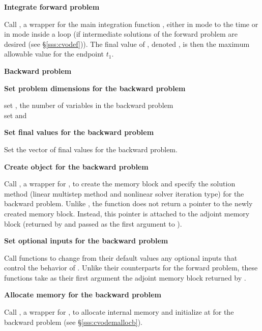 \begin{Steps}
\item
  {\bf Integrate forward problem}

  Call , a wrapper for the {\cvodes} main integration
  function , either in  mode to the time 
   or in  mode inside a loop (if intermediate
  solutions of the forward problem are desired (see \S\ref{sss:cvodef})).
  The final value of , denoted , is then
  the maximum allowable value for the endpoint $t_1$.

  \vspace{0.2in}\centerline{\bf Backward problem}

\item \label{i:back_start}
  {\bf Set problem dimensions for the backward problem}

  {\s} set , the number of variables in the backward problem \\
  {\p} set  and 

\item
  {\bf Set final values for the backward problem}

  Set the vector  of final values for the backward problem.

\item
  {\bf Create {\cvodes} object for the backward problem}

  Call , a wrapper for , to
  create the {\cvodes} memory block and specify the solution method
  (linear multistep method and nonlinear solver iteration type) for
  the backward problem. Unlike , the function 
  does not return a pointer to the newly created memory block. Instead,
  this pointer is attached to the adjoint memory block (returned by
   and passed as the first argument to ).

\item
  {\bf Set optional inputs for the backward problem}

  Call  functions to change from their default values
  any optional inputs that control the behavior of {\cvodes}. Unlike
  their counterparts for the forward problem, these functions take as
  their first argument the adjoint memory block returned by .

\item
  {\bf Allocate memory for the backward problem}

  Call , a wrapper for , to 
  allocate internal memory and initialize {\cvodes} at  for 
  the backward problem (see \S\ref{sss:cvodemallocb}).


\end{Steps}
